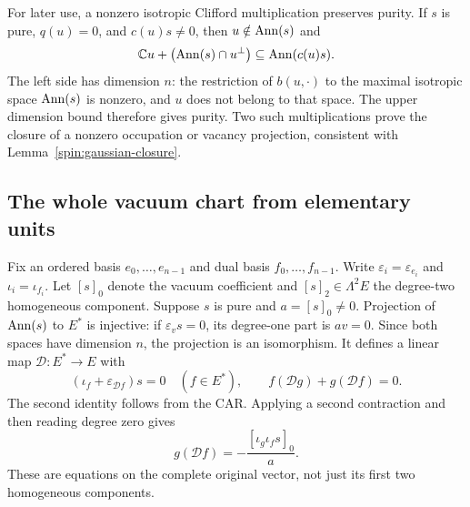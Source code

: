 For later use, a nonzero isotropic Clifford multiplication preserves
purity. If $s$ is pure, $q(u)=0$, and $c(u)s\ne0$, then $u\notin\operatorname{Ann}(s)$
and
\[
 \mathbb C u+\bigl(\operatorname{Ann}(s)\cap u^\perp\bigr)\subseteq\operatorname{Ann}(c(u)s).
\]
The left side has dimension $n$: the restriction of $b(u,\cdot)$ to the
maximal isotropic space $\operatorname{Ann}(s)$ is nonzero, and $u$ does not belong to
that space. The upper dimension bound therefore gives purity. Two such
multiplications prove the closure of a nonzero occupation or vacancy
projection, consistent with Lemma~\ref{spin:gaussian-closure}.

\subsection{The whole vacuum chart from elementary units}

Fix an ordered basis $e_0,\ldots,e_{n-1}$ and dual basis
$f_0,\ldots,f_{n-1}$. Write $\varepsilon_i=\varepsilon_{e_i}$ and
$\iota_i=\iota_{f_i}$. Let $[s]_0$ denote the vacuum coefficient and
$[s]_2\in\Lambda^2E$ the degree-two homogeneous component.
Suppose $s$ is pure and $a=[s]_0\ne0$. Projection of $\operatorname{Ann}(s)$ to $E^*$
is injective: if $\varepsilon_v s=0$, its degree-one part is $av=0$.
Since both spaces have dimension $n$, the projection is an isomorphism.
It defines a linear map $\mathcal D:E^*\to E$ with
\begin{equation}
 (\iota_f+\varepsilon_{\mathcal D f})s=0\quad(f\in E^*),\qquad
 f(\mathcal D g)+g(\mathcal D f)=0.
 \label{rank:graph}
\end{equation}
The second identity follows from the CAR. Applying a second contraction
and then reading degree zero gives
\begin{equation}
 g(\mathcal D f)=-\frac{[\iota_g\iota_fs]_0}{a}.
 \label{rank:graph-coordinates}
\end{equation}
These are equations on the complete original vector, not just its first
two homogeneous components.


